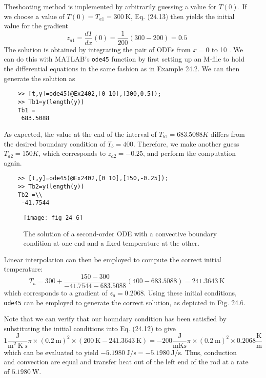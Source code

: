 \documentclass[../main.tex]{subfiles}
\begin{document}
\begin{exmp}
    Theshooting method is implemented by arbitrarily guessing a value for $T(0)$. If we choose a value of $T(0)=T_{a 1}=300 \mathrm{~K}$, Eq. (24.13) then yields the initial value for the gradient
    $$
    z_{a 1}=\frac{d T}{d x}(0)=\frac{1}{200}(300-200)=0.5
    $$
    The solution is obtained by integrating the pair of ODEs from $x=0$ to 10 . We can do this with MATLAB's \texttt{ode45} function by first setting up an M-file to hold the differential equations in the same fashion as in Example 24.2. We can then generate the solution as
    \begin{lstlisting}
    >> [t,y]=ode45(@Ex2402,[0 10],[300,0.5]);
    >> Tb1=y(length(y))
    Tb1 =
     683.5088
    \end{lstlisting}
    

    As expected, the value at the end of the interval of $T_{b1} = 683.5088 K$ differs from the
    desired boundary condition of $T_b = 400$. Therefore, we make another guess $T_{a2} = 150 K$,
    which corresponds to $z_{a2} = -0.25$, and perform the computation again.
    \begin{lstlisting}
    >> [t,y]=ode45(@Ex2402,[0 10],[150,-0.25]);
    >> Tb2=y(length(y))
    Tb2 =\\
     -41.7544
    \end{lstlisting}
    

    \begin{figure}[H]
        \centering
        \texttt{[image: fig\_24\_6]}
       \caption{\textsf{The solution of a second-order ODE with a convective boundary condition at one end and a
       fixed temperature at the other.}}\label{fig:fig_24_6}
    \end{figure}

    \noindent Linear interpolation can then be employed to compute the correct initial temperature:
    $$
    T_{a}=300+\frac{150-300}{-41.7544-683.5088}(400-683.5088)=241.3643 \mathrm{~K}
    $$
    which corresponds to a gradient of $z_{a}=0.2068$. Using these initial conditions, \texttt{ode45} can be employed to generate the correct solution, as depicted in Fig. 24.6.

    Note that we can verify that our boundary condition has been satisfied by substituting the initial conditions into Eq. (24.12) to give
    $$
    1 \frac{\mathrm{J}}{\mathrm{m}^{2} \mathrm{~K} \mathrm{~s}} \pi \times(0.2 \mathrm{~m})^{2} \times(200 \mathrm{~K}-241.3643 \mathrm{~K})=-200 \frac{\mathrm{J}}{\mathrm{m} \mathrm{K} \mathrm{s}} \pi \times(0.2 \mathrm{~m})^{2} \times 0.2068 \frac{\mathrm{K}}{\mathrm{m}}
    $$
    which can be evaluated to yield $-5.1980 \mathrm{~J} / \mathrm{s}=-5.1980 \mathrm{~J} / \mathrm{s}$. Thus, conduction and convection are equal and transfer heat out of the left end of the rod at a rate of $5.1980 \mathrm{~W}$.
\end{exmp}
\end{document}

